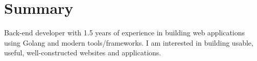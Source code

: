 \documentclass[letterpaper,11pt]{article}
\begin{document}
\section{Summary}
\begin{itemize}[leftmargin=0.15in, label={}]
\small{\item{Back-end developer with 1.5 years of experience in building web applications using Golang and modern tools/frameworks. I am interested in building usable, useful, well-constructed websites and applications. } \
}
\end{itemize}

\end{document}
